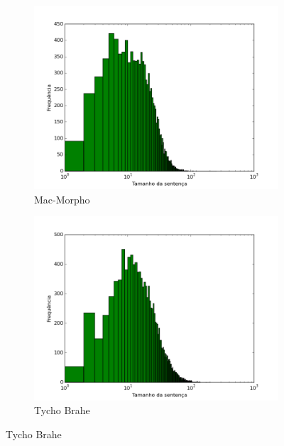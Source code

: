 \begin{figure}[!htb]
  \caption{Distribuição dos comprimentos das sentenças}
  \begin{subfigure}[htb]{0.5\textwidth} 
     \includegraphics[width=\textwidth]{img/distribuicao_macmorphov3_test.png} 
    \caption{Mac-Morpho} \label{fig:distribuicaocorpus1}
  \end{subfigure} 
  \begin{subfigure}[htb]{0.5\textwidth}
    \includegraphics[width=\textwidth]{img/distribuicao_tychobrahe_test.png} 
    \caption{Tycho Brahe} \label{fig:distribuicaocorpus2}
  \end{subfigure} 
\end{figure}



